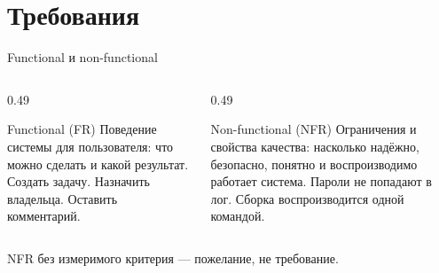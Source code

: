 \section{Требования}

\begin{frame}{Functional и non-functional}
  \sloppy
  \vspace{0.2em}
  \begin{columns}[T]
    \begin{column}{0.49\textwidth}
      \begin{block}{Functional (FR)}
        Поведение системы для пользователя:
        что можно сделать и какой результат.
        \vspace{0.35em}
        {\small Создать задачу. Назначить владельца.
        Оставить комментарий.}
      \end{block}
    \end{column}
    \begin{column}{0.49\textwidth}
      \begin{block}{Non-functional (NFR)}
        Ограничения и свойства качества:
        насколько надёжно, безопасно,
        понятно и воспроизводимо работает система.
        \vspace{0.35em}
        {\small Пароли не попадают в лог. Сборка
        воспроизводится одной командой.}
      \end{block}
    \end{column}
  \end{columns}

  \vspace{0.45em}
  {\small\color{acGray}
  NFR без измеримого критерия --- пожелание, не требование.}
\end{frame}
